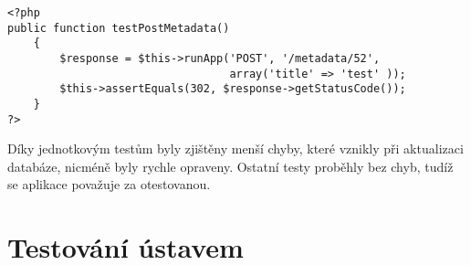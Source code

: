         \pagebreak
        
        \begin{verbatim}
<?php
public function testPostMetadata()
    {
        $response = $this->runApp('POST', '/metadata/52', 
                                  array('title' => 'test' ));
        $this->assertEquals(302, $response->getStatusCode());
    }
?>
        \end{verbatim}
        
        Díky jednotkovým testům byly zjištěny menší chyby, které vznikly při aktualizaci databáze, nicméně byly rychle opraveny. Ostatní testy proběhly bez chyb, tudíž se aplikace považuje za otestovanou.
        
    \section{Testování ústavem}
        

